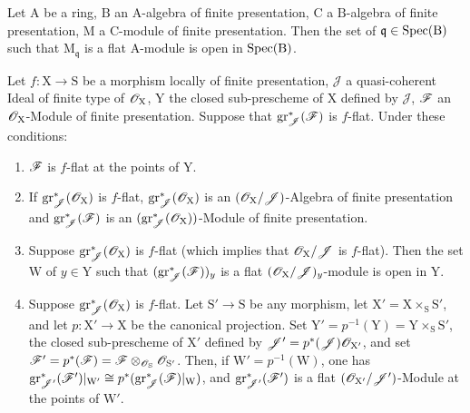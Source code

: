 \begin{corollary}[11.3.3]
\label{IV.11.3.3}
Let $\mathrm{A}$ be a ring, $\mathrm{B}$ an $\mathrm{A}$-algebra of finite presentation, $\mathrm{C}$ a $\mathrm{B}$-algebra of finite presentation, $\mathrm{M}$ a $\mathrm{C}$-module of finite presentation. Then the set of $\mathfrak{q}\in\operatorname{Spec}(\mathrm{B})$ such that $\mathrm{M}_\mathfrak{q}$ is a flat $\mathrm{A}$-module is open in $\operatorname{Spec}(\mathrm{B})$.
\end{corollary}

\begin{proposition}[11.3.4]
\label{IV.11.3.4}
Let $f:\mathrm{X}\to\mathrm{S}$ be a morphism locally of finite presentation, $\mathscr{J}$ a quasi-coherent Ideal of finite type of $\mathscr{O}_\mathrm{X}$, $\mathrm{Y}$ the closed sub-prescheme of $\mathrm{X}$ defined by $\mathscr{J}$, $\mathscr{F}$ an $\mathscr{O}_\mathrm{X}$-Module of finite presentation. Suppose that $\operatorname{gr}^*_\mathscr{J}(\mathscr{F})$ is $f$-flat. Under these conditions:
\begin{enumerate}[label=\emph{(\roman*)}]
  \item $\mathscr{F}$ is $f$-flat at the points of $\mathrm{Y}$.
  \item If $\operatorname{gr}^*_\mathscr{J}(\mathscr{O}_\mathrm{X})$ is $f$-flat, $\operatorname{gr}^*_\mathscr{J}(\mathscr{O}_\mathrm{X})$ is an $(\mathscr{O}_\mathrm{X}/\mathscr{J})$-Algebra of finite presentation and $\operatorname{gr}^*_\mathscr{J}(\mathscr{F})$ is an $(\operatorname{gr}^*_\mathscr{J}(\mathscr{O}_\mathrm{X}))$-Module of finite presentation.
  \item Suppose $\operatorname{gr}^*_\mathscr{J}(\mathscr{O}_\mathrm{X})$ is $f$-flat (which implies that $\mathscr{O}_\mathrm{X}/\mathscr{J}$ is $f$-flat). Then the set $\mathrm{W}$ of $y\in\mathrm{Y}$ such that $(\operatorname{gr}^*_\mathscr{J}(\mathscr{F}))_y$ is a flat $(\mathscr{O}_\mathrm{X}/\mathscr{J})_y$-module is open in $\mathrm{Y}$.
  \item Suppose $\operatorname{gr}^*_\mathscr{J}(\mathscr{O}_\mathrm{X})$ is $f$-flat. Let $\mathrm{S}'\to\mathrm{S}$ be any morphism, let $\mathrm{X}'=\mathrm{X}\times_\mathrm{S}\mathrm{S}'$, and let $p:\mathrm{X}'\to\mathrm{X}$ be the canonical projection. Set $\mathrm{Y}'=p^{-1}(\mathrm{Y})=\mathrm{Y}\times_\mathrm{S}\mathrm{S}'$, the closed sub-prescheme of $\mathrm{X}'$ defined by $\mathscr{J}'=p^*(\mathscr{J})\mathscr{O}_{\mathrm{X}'}$, and set $\mathscr{F}'=p^*(\mathscr{F})=\mathscr{F}\otimes_{\mathscr{O}_\mathrm{S}}\mathscr{O}_{\mathrm{S}'}$. Then, if $\mathrm{W}'=p^{-1}(\mathrm{W})$, one has $\operatorname{gr}^*_{\mathscr{J}'}(\mathscr{F}')|_{\mathrm{W}'}\cong p^*(\operatorname{gr}^*_\mathscr{J}(\mathscr{F})|_\mathrm{W})$, and $\operatorname{gr}^*_{\mathscr{J}'}(\mathscr{F}')$ is a flat $(\mathscr{O}_{\mathrm{X}'}/\mathscr{J}')$-Module at the points of $\mathrm{W}'$.
\end{enumerate}
\end{proposition}

